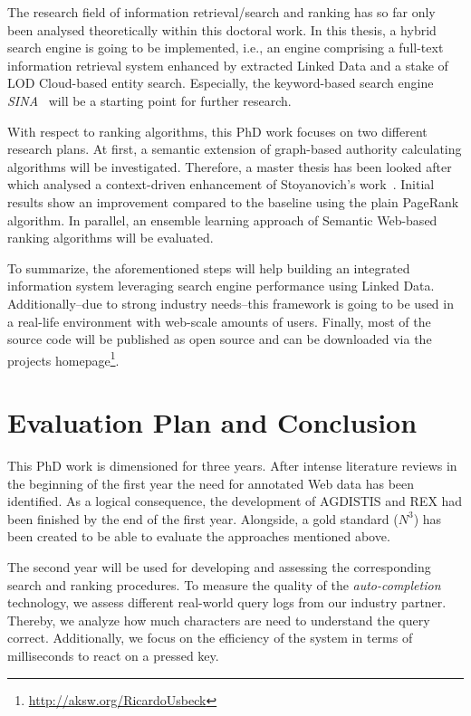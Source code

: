 The research field of information retrieval/search and ranking has so far only been analysed theoretically within this doctoral work. 
In this thesis, a hybrid search engine is going to be implemented, i.e., an engine comprising a full-text information retrieval system enhanced by extracted Linked Data and a stake of LOD Cloud-based entity search.
Especially, the keyword-based search engine \emph{SINA}~\cite{SINA} will be a starting point for further research. 

With respect to ranking algorithms, this PhD work focuses on two different research plans.
At first, a semantic extension of graph-based authority calculating algorithms will be investigated. 
Therefore, a master thesis has been looked after which analysed a context-driven enhancement of Stoyanovich's work~\cite{Stoyanovich}.
Initial results show an improvement compared to the baseline using the plain PageRank algorithm.
In parallel, an ensemble learning approach of Semantic Web-based ranking algorithms will be evaluated.

To summarize, the aforementioned steps will help building an integrated information system leveraging search engine performance using Linked Data.
Additionally--due to strong industry needs--this framework is going to be used in a real-life environment with web-scale amounts of users.
Finally, most of the source code will be published as open source and can be downloaded via the projects homepage\footnote{\url{http://aksw.org/RicardoUsbeck}}.

\section{Evaluation Plan and Conclusion}\label{conclusion}
This PhD work is dimensioned for three years. 
After intense literature reviews in the beginning of the first year the need for annotated Web data has been identified.
As a logical consequence, the development of AGDISTIS and REX had been finished by the end of the first year. 
Alongside, a gold standard ($N^3$) has been created to be able to evaluate the approaches mentioned above.

The second year will be used for developing and assessing the corresponding search and ranking procedures. 
To measure the quality of the \emph{auto-completion} technology, we assess different real-world query logs from our industry partner.
Thereby, we analyze how much characters are need to understand the query correct.
Additionally, we focus on the efficiency of the system in terms of milliseconds to react on a pressed key.

